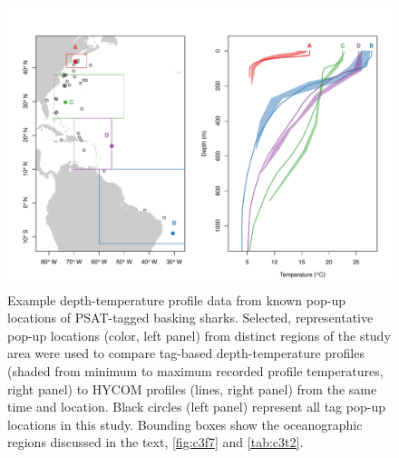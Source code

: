\begin{figure}[t]
\centering
\includegraphics[width=1\textwidth]{images/C3_Fig1.pdf}
\caption[Comparison of depth-temperature profile data]{Example depth-temperature profile data from known pop-up locations of PSAT-tagged basking sharks. Selected, representative pop-up locations (color, left panel) from distinct regions of the study area were used to compare tag-based depth-temperature profiles (shaded from minimum to maximum recorded profile temperatures, right panel) to HYCOM profiles (lines, right panel) from the same time and location. Black circles (left panel) represent all tag pop-up locations in this study. Bounding boxes show the oceanographic regions discussed in the text, \cref{fig:c3f7} and \cref{tab:c3t2}.}
\label{fig:c3f1}
\end{figure}


